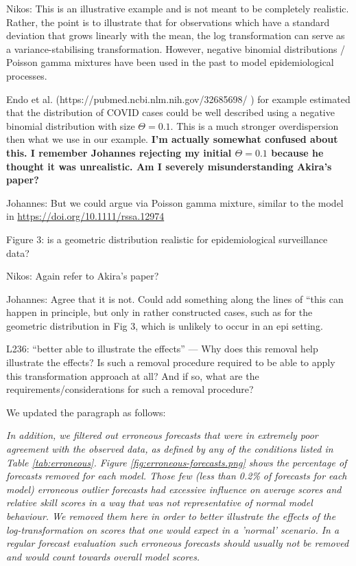 \documentclass{article}
\newcommand{\red}{\color{red}}
\newcommand{\black}{\color{black}}
\newcommand{\blue}{\color{blue}}
\begin{document}
\black
Nikos: This is an illustrative example and is not meant to be completely realistic. Rather, the point is to illustrate that for observations which have a standard deviation that grows linearly with the mean, the log transformation can serve as a variance-stabilising transformation. However, negative binomial distributions / Poisson gamma mixtures have been used in the past to model epidemiological processes. 

Endo et al. (https://pubmed.ncbi.nlm.nih.gov/32685698/ ) for example estimated that the distribution of COVID cases could be well described using a negative binomial distribution with size $\Theta = 0.1$. This is a much stronger overdispersion then what we use in our example. 
\textbf{I'm actually somewhat confused about this. I remember Johannes rejecting my initial $\Theta = 0.1$ because he thought it was unrealistic. Am I severely misunderstanding Akira's paper?}


Johannes: But we could argue via Poisson gamma mixture, similar to the model in \url{https://doi.org/10.1111/rssa.12974}

\red
Figure 3: is a geometric distribution realistic for epidemiological surveillance data?

\black
Nikos: Again refer to Akira's paper? 

Johannes: Agree that it is not. Could add something along the lines of ``this can happen in principle, but only in rather constructed cases, such as for the geometric distribution in Fig 3, which is unlikely to occur in an epi setting.

\blue
L236: “better able to illustrate the effects” — Why does this removal help illustrate the effects? Is such a removal procedure required to be able to apply this transformation approach at all? And if so, what are the requirements/considerations for such a removal procedure?

\black
We updated the paragraph as follows: 

\textit{In addition, we filtered out erroneous forecasts that were in extremely poor agreement with the observed data, as defined by any of the conditions listed in Table \ref{tab:erroneous}. Figure \ref{fig:erroneous-forecasts.png} shows the percentage of forecasts removed for each model. Those few (less than 0.2\%  of forecasts for each model) erroneous outlier forecasts had excessive influence on average scores and relative skill scores in a way that was not representative of normal model behaviour. We removed them here in order to better illustrate the effects of the log-transformation on scores that one would expect in a 'normal' scenario. In a regular forecast evaluation such erroneous forecasts should usually not be removed and would count towards overall model scores.} 
\end{document}
